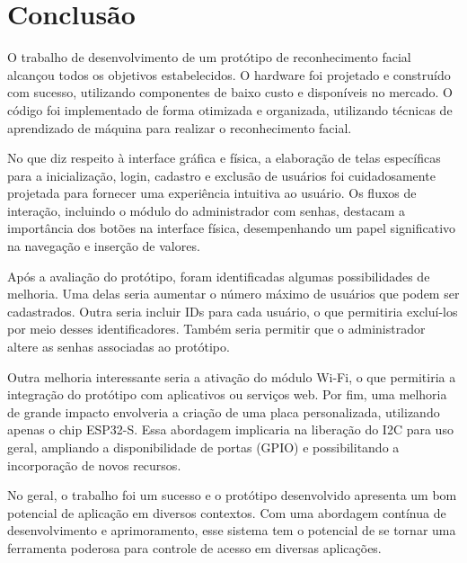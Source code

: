 \chapter{Conclusão}\label{cap:conclusoeseperspectivas}


O trabalho de desenvolvimento de um protótipo de reconhecimento 
facial alcançou todos os objetivos estabelecidos. O hardware foi 
projetado e construído com sucesso, utilizando componentes de baixo 
custo e disponíveis no mercado. O código foi implementado de 
forma otimizada e organizada, utilizando técnicas de aprendizado 
de máquina para realizar o reconhecimento facial. 

No que diz respeito à interface gráfica e física, a elaboração de 
telas específicas para a inicialização, login, cadastro e exclusão 
de usuários foi cuidadosamente projetada para fornecer uma 
experiência intuitiva ao usuário. 
Os fluxos de interação, incluindo o módulo do administrador com 
senhas, destacam a importância dos botões na interface física, 
desempenhando um papel significativo na navegação e inserção de 
valores.

Após a avaliação do protótipo, foram identificadas algumas 
possibilidades de melhoria. Uma delas seria aumentar o número máximo de 
usuários que podem ser cadastrados. Outra seria incluir IDs para cada 
usuário, o que permitiria excluí-los por meio desses identificadores. 
Também seria permitir que o administrador altere as senhas 
associadas ao protótipo.

Outra melhoria interessante seria a ativação do módulo Wi-Fi, o 
que permitiria a integração do protótipo com aplicativos ou 
serviços web. Por fim, uma melhoria de grande impacto envolveria 
a criação de uma placa personalizada, utilizando apenas o chip 
ESP32-S. Essa abordagem implicaria na liberação do I2C para uso 
geral, ampliando a disponibilidade de portas (GPIO) e 
possibilitando a incorporação de novos recursos.

No geral, o trabalho foi um sucesso e o protótipo desenvolvido 
apresenta um bom potencial de aplicação em diversos contextos. 
Com uma abordagem contínua de desenvolvimento e aprimoramento, esse sistema 
tem o potencial de se tornar uma ferramenta poderosa para controle de acesso 
em diversas aplicações.